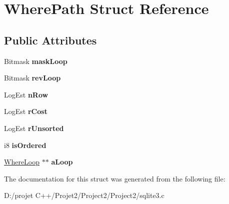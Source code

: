 \hypertarget{struct_where_path}{}\section{Where\+Path Struct Reference}
\label{struct_where_path}
\subsection*{Public Attributes}
\begin{DoxyCompactItemize}
\item 
\mbox{\label{struct_where_path_a4a0a59d31e51c3a8f9fdfdbfb384ab73}} 
Bitmask {\bfseries mask\+Loop}
\item 
\mbox{\label{struct_where_path_a6f6bf0a804430fb08f4aadc506f5cc14}} 
Bitmask {\bfseries rev\+Loop}
\item 
\mbox{\label{struct_where_path_ab9e893b128d34fc8bc832de593387c99}} 
Log\+Est {\bfseries n\+Row}
\item 
\mbox{\label{struct_where_path_a8ca2a9ddc42527170167eb6f08d85878}} 
Log\+Est {\bfseries r\+Cost}
\item 
\mbox{\label{struct_where_path_a69b10c1c4a8e00814f80144dad12c4ad}} 
Log\+Est {\bfseries r\+Unsorted}
\item 
\mbox{\label{struct_where_path_a2793b5b50bc1ec2cf8f9c6e5744c2826}} 
i8 {\bfseries is\+Ordered}
\item 
\mbox{\label{struct_where_path_a63e12088b414ce0b0b1ee43655733dd1}} 
\mbox{\hyperlink{struct_where_loop}{Where\+Loop}} $\ast$$\ast$ {\bfseries a\+Loop}
\end{DoxyCompactItemize}


The documentation for this struct was generated from the following file\+:\begin{DoxyCompactItemize}
\item 
D\+:/projet C++/\+Projet2/\+Project2/\+Project2/sqlite3.\+c\end{DoxyCompactItemize}
